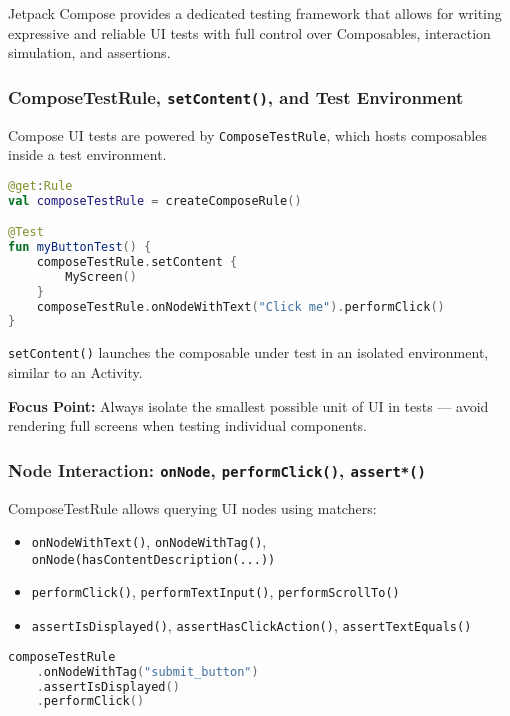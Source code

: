 \documentclass[a4paper,12pt]{article}
\begin{document}
Jetpack Compose provides a dedicated testing framework that allows for writing expressive and reliable UI tests with full control over Composables, interaction simulation, and assertions.

\subsubsection{ComposeTestRule, \texttt{setContent()}, and Test Environment}

Compose UI tests are powered by \texttt{ComposeTestRule}, which hosts composables inside a test environment.

\begin{lstlisting}[language=Kotlin]
@get:Rule
val composeTestRule = createComposeRule()

@Test
fun myButtonTest() {
    composeTestRule.setContent {
        MyScreen()
    }
    composeTestRule.onNodeWithText("Click me").performClick()
}
\end{lstlisting}

\texttt{setContent()} launches the composable under test in an isolated environment, similar to an Activity.

\textbf{Focus Point:} Always isolate the smallest possible unit of UI in tests — avoid rendering full screens when testing individual components.

\subsubsection{Node Interaction: \texttt{onNode}, \texttt{performClick()}, \texttt{assert*()}}

ComposeTestRule allows querying UI nodes using matchers:

\begin{itemize}
  \item \texttt{onNodeWithText()}, \texttt{onNodeWithTag()}, \texttt{onNode(hasContentDescription(...))}
  \item \texttt{performClick()}, \texttt{performTextInput()}, \texttt{performScrollTo()}
  \item \texttt{assertIsDisplayed()}, \texttt{assertHasClickAction()}, \texttt{assertTextEquals()}
\end{itemize}

\begin{lstlisting}[language=Kotlin]
composeTestRule
    .onNodeWithTag("submit_button")
    .assertIsDisplayed()
    .performClick()
\end{lstlisting}
\end{document}
